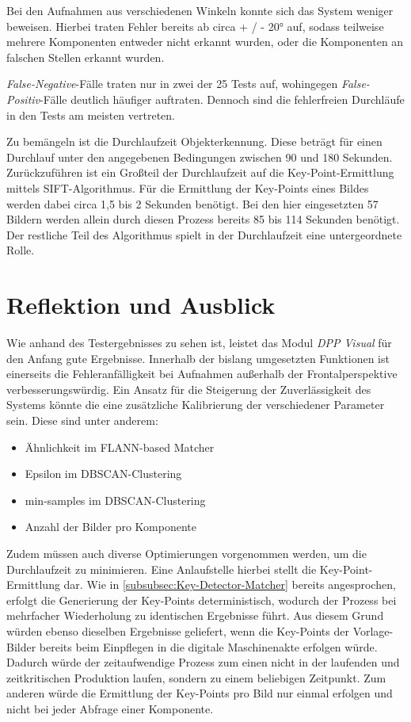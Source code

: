 \documentclass[
    type=Projektarbeit,
    status=draft, %
    language=german, %
    bibengine=bibtex,
]{unibwm-inf-thesis}
\begin{document}
    Bei den Aufnahmen aus verschiedenen Winkeln konnte sich das System weniger beweisen.
    Hierbei traten Fehler bereits ab circa + / - 20° auf, sodass teilweise mehrere Komponenten entweder nicht erkannt wurden, oder die Komponenten an falschen Stellen erkannt wurden.

    \textit{False-Negative}-Fälle traten nur in zwei der 25 Tests auf, wohingegen \textit{False-Positiv}-Fälle deutlich häufiger auftraten.
    Dennoch sind die fehlerfreien Durchläufe in den Tests am meisten vertreten.

    Zu bemängeln ist die Durchlaufzeit Objekterkennung.
    Diese beträgt für einen Durchlauf unter den angegebenen Bedingungen zwischen 90 und 180 Sekunden.
    Zurückzuführen ist ein Großteil der Durchlaufzeit auf die Key-Point-Ermittlung mittels SIFT-Algorithmus.
    Für die Ermittlung der Key-Points eines Bildes werden dabei circa 1,5 bis 2 Sekunden benötigt.
    Bei den hier eingesetzten 57 Bildern werden allein durch diesen Prozess bereits 85 bis 114 Sekunden benötigt.
    Der restliche Teil des Algorithmus spielt in der Durchlaufzeit eine untergeordnete Rolle.


    \section{Reflektion und Ausblick}
    Wie anhand des Testergebnisses zu sehen ist, leistet das Modul \textit{DPP Visual} für den Anfang gute Ergebnisse.
    Innerhalb der bislang umgesetzten Funktionen ist einerseits die Fehleranfälligkeit bei Aufnahmen außerhalb der Frontalperspektive verbesserungswürdig.
    Ein Ansatz für die Steigerung der Zuverlässigkeit des Systems könnte die eine zusätzliche Kalibrierung der verschiedener Parameter sein.
    Diese sind unter anderem:
    \begin{itemize}
        \item Ähnlichkeit im FLANN-based Matcher
        \item Epsilon im DBSCAN-Clustering
        \item min-samples im DBSCAN-Clustering
        \item Anzahl der Bilder pro Komponente
    \end{itemize}

    Zudem müssen auch diverse Optimierungen vorgenommen werden, um die Durchlaufzeit zu minimieren.
    Eine Anlaufstelle hierbei stellt die Key-Point-Ermittlung dar.
    Wie in \autoref{subsubsec:Key-Detector-Matcher} bereits angesprochen, erfolgt die Generierung der Key-Points deterministisch, wodurch der Prozess bei mehrfacher Wiederholung zu identischen Ergebnisse führt.
    Aus diesem Grund würden ebenso dieselben Ergebnisse geliefert, wenn die Key-Points der Vorlage-Bilder bereits beim Einpflegen in die digitale Maschinenakte erfolgen würde.
    Dadurch würde der zeitaufwendige Prozess zum einen nicht in der laufenden und zeitkritischen Produktion laufen, sondern zu einem beliebigen Zeitpunkt.
    Zum anderen würde die Ermittlung der Key-Points pro Bild nur einmal erfolgen und nicht bei jeder Abfrage einer Komponente.
\end{document}
